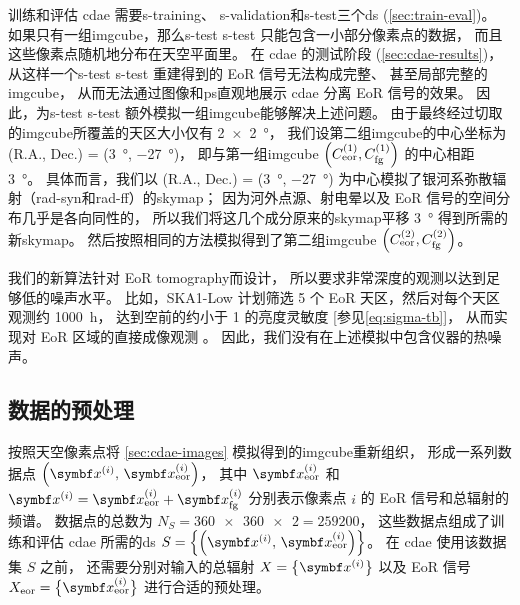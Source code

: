 训练和评估 \ac{cdae} 需要\acl{s-training}、
\acl{s-validation}和\acl{s-test}三个\ac{ds} (\autoref{sec:train-eval})。
如果只有一组\ac{imgcube}，那么\acl{s-test} \ac{s-test} 只能包含一小部分像素点的数据，
而且这些像素点随机地分布在天空平面里。
在 \ac{cdae} 的测试阶段 (\autoref{sec:cdae-results})，
从这样一个\acl{s-test} \ac{s-test} 重建得到的 EoR 信号无法构成完整、
甚至局部完整的\ac{imgcube}，
从而无法通过图像和\ac{ps}直观地展示 \ac{cdae} 分离 EoR 信号的效果。
因此，为\acl{s-test} \ac{s-test} 额外模拟一组\ac{imgcube}能够解决上述问题。
由于最终经过切取的\ac{imgcube}所覆盖的天区大小仅有 \SI{2 x 2}{\degree}，
我们设第二组\ac{imgcube}的中心坐标为
(R.A., Dec.\@) = (\SI{3}{\degree}, \SI{-27}{\degree})，
即与第一组\ac{imgcube}
$\left( C_{\mathrm{eor}}^{(1)}, C_{\mathrm{fg}}^{(1)} \right)$
的中心相距 \SI{3}{\degree}。
具体而言，我们以 (R.A., Dec.\@) = (\SI{3}{\degree}, \SI{-27}{\degree})
为中心模拟了银河系弥散辐射（\ac{rad-syn}和\ac{rad-ff}）的\ac{skymap}；
因为河外点源、射电晕以及 EoR 信号的空间分布几乎是各向同性的，
所以我们将这几个成分原来的\ac{skymap}平移 \SI{3}{\degree} 得到所需的新\ac{skymap}。
然后按照相同的方法模拟得到了第二组\ac{imgcube}
$\left( C_{\mathrm{eor}}^{(2)}, C_{\mathrm{fg}}^{(2)} \right)$。

我们的新算法针对 EoR \ac{tomography}而设计，
所以要求非常深度的观测以达到足够低的噪声水平。
比如，SKA1-Low 计划筛选 5 个 EoR 天区，然后对每个天区观测约 \SI{1000}{\hour}，
达到空前的约小于 \SI{1}{\mK} 的亮度灵敏度 [参见\autoref{eq:sigma-tb}]，
从而实现对 EoR 区域的直接成像观测 \cite{mellema2013,mellema2015,koopmans2015}。
因此，我们没有在上述模拟中包含仪器的热噪声。

\subsection{数据的预处理}
\label{sec:preprocessing}

按照天空像素点将 \autoref{sec:cdae-images} 模拟得到的\ac{imgcube}重新组织，
形成一系列数据点 $\left( \B{x}^{(i)}, \,\B{x}^{(i)}_{\R{eor}} \right)$，
其中 $\B{x}^{(i)}_{\R{eor}}$ 和
$\B{x}^{(i)} = \B{x}^{(i)}_{\R{eor}} + \B{x}^{(i)}_{\R{fg}}$
分别表示像素点 $i$ 的 EoR 信号和总辐射的频谱。
数据点的总数为 $N_S = \num{360x360 x 2} = \num{259200}$，
这些数据点组成了训练和评估 \ac{cdae} 所需的\ac{ds}
$S = \left\{ \left(\B{x}^{(i)}, \,\B{x}^{(i)}_{\R{eor}} \right) \right\}$。
在 \ac{cdae} 使用该数据集 $S$ 之前，
还需要分别对输入的总辐射 $X = \big\{ \B{x}^{(i)} \big\}$
以及 EoR 信号 $X_{\R{eor}} = \big\{ \B{x}^{(i)}_{\R{eor}} \big\}$
进行合适的预处理。

